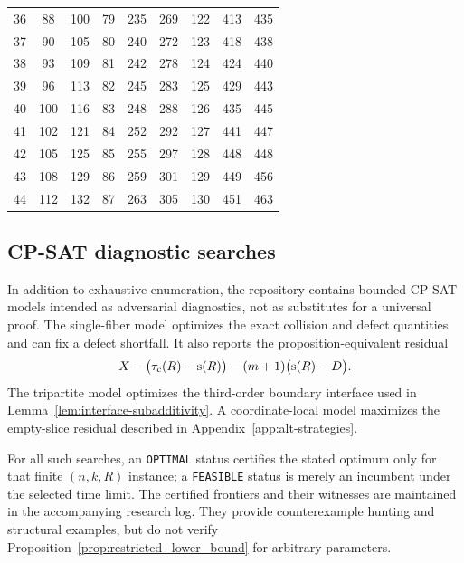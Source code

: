 \begin{table}[H]
\begin{tabular}{ccc|ccc|ccc}
		36  & 88         & 100          & 79  & 235        & 269          & 122 & 413        & 435          \\
		37  & 90         & 105          & 80  & 240        & 272          & 123 & 418        & 438          \\
		38  & 93         & 109          & 81  & 242        & 278          & 124 & 424        & 440          \\
		39  & 96         & 113          & 82  & 245        & 283          & 125 & 429        & 443          \\
		40  & 100        & 116          & 83  & 248        & 288          & 126 & 435        & 445          \\
		41  & 102        & 121          & 84  & 252        & 292          & 127 & 441        & 447          \\
		42  & 105        & 125          & 85  & 255        & 297          & 128 & 448        & 448          \\
		43  & 108        & 129          & 86  & 259        & 301          & 129 & 449        & 456          \\
		44  & 112        & 132          & 87  & 263        & 305          & 130 & 451        & 463          \\
		\bottomrule
	\end{tabular}
\end{table}

\subsection{CP-SAT diagnostic searches}

In addition to exhaustive enumeration, the repository contains bounded
CP-SAT models intended as adversarial diagnostics, not as substitutes for a
universal proof.  The single-fiber model optimizes the exact collision and
defect quantities and can fix a defect shortfall.  It also reports the
proposition-equivalent residual
\[X-\bigl(\tau_{\mathrm{c}}(R)-\mathrm{s}(R)\bigr)-(m+1)\bigl(\mathrm{s}(R)-D\bigr).
\]
The tripartite model optimizes the third-order boundary interface used in
Lemma~\ref{lem:interface-subadditivity}.  A coordinate-local model maximizes
the empty-slice residual described in Appendix~\ref{app:alt-strategies}.

For all such searches, an \texttt{OPTIMAL} status certifies the stated optimum
only for that finite $(n,k,R)$ instance; a \texttt{FEASIBLE} status is merely
an incumbent under the selected time limit.  The certified frontiers and their
witnesses are maintained in the accompanying research log.  They provide
counterexample hunting and structural examples, but do not verify
Proposition~\ref{prop:restricted_lower_bound} for arbitrary parameters.


